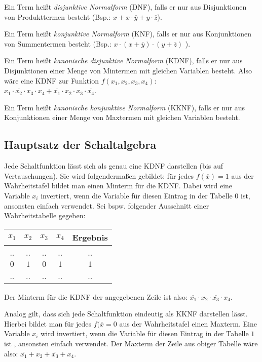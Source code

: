 \documentclass[11pt]{article}
\begin{document}
Ein Term heißt \textit{disjunktive Normalform} (DNF), falls er nur aus Disjunktionen von Produkttermen besteht (Bsp.: \(x+x\cdot\overline{y}+y\cdot\overline{z} \)).

Ein Term heißt \textit{konjunktive Normalform} (KNF), falls er nur aus Konjunktionen von Summentermen besteht (Bsp.: \( x\cdot(x+\overline{y})\cdot(y+\overline{z})\) ).

Ein Term heißt \textit{kanonische disjunktive Normalform} (KDNF), falls er nur aus Disjunktionen einer Menge von Mintermen mit gleichen Variablen besteht. Also wäre eine KDNF zur Funktion \(f(x_1,x_2,x_3,x_4)\): \\\( x_1 \cdot \overline{x_2} \cdot x_3 \cdot x_4 + \overline{x_1} \cdot x_2 \cdot x_3 \cdot \overline{x_4} \).

Ein Term heißt \textit{kanonische konjunktive Normalform} (KKNF), falls er nur aus Konjunktionen einer Menge von Maxtermen mit gleichen Variablen besteht.

\subsection{Hauptsatz der Schaltalgebra}
Jede Schaltfunktion lässt sich als genau eine KDNF darstellen (bis auf Vertauschungen). Sie wird folgendermaßen gebildet: für jedes \( f(\overline{x})=1\) aus der Wahrheitstafel bildet man einen Minterm für die KDNF. Dabei wird eine Variable \(x_i\) invertiert, wenn die Variable für diesen Eintrag in der Tabelle \(0\) ist, ansonsten einfach verwendet. Sei bspw. folgender Ausschnitt einer Wahrheitstabelle gegeben:
\begin{center}
\begin{tabular}{c|c|c|c||c}
  \(x_1\) & \(x_2\) & \(x_3\) & \(x_4\) & Ergebnis \\ \hline
  .. & .. & .. & .. & .. \\ \hline
  \(0\) & \(1\) & \(0\) & \(1\) & \(1\) \\ \hline
  .. & .. & .. & .. & ..
\end{tabular}
\end{center}
Der Minterm für die KDNF der angegebenen Zeile ist also: \( \overline{x_1} \cdot x_2 \cdot \overline{x_3} \cdot x_4\).

Analog gilt, dass sich jede Schaltfunktion eindeutig als KKNF darstellen lässt. Hierbei bildet man für jedes \(f(\overline{x}=0\) aus der Wahrheitstafel einen Maxterm. Eine Variable \(x_i\) wird invertiert, wenn die Variable für diesen Eintrag in der Tabelle \(1\) ist , ansonsten einfach verwendet. Der Maxterm der Zeile aus obiger Tabelle wäre also: \( \overline{x_1} + x_2 + \overline{x_3} + x_4\).
\end{document}
